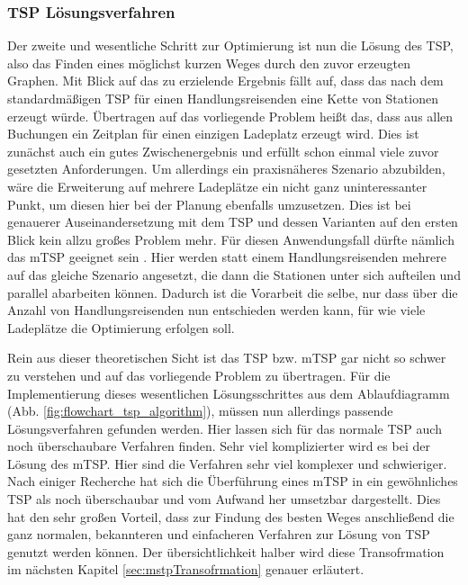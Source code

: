 \subsubsection{TSP Lösungsverfahren}
\label{sec:tspVerfahrenPlanung}

Der zweite und wesentliche Schritt zur Optimierung ist nun die Lösung des TSP, also das Finden eines möglichst kurzen Weges durch den zuvor erzeugten Graphen. Mit Blick auf das zu erzielende Ergebnis fällt auf, dass das nach dem standardmäßigen TSP für einen Handlungsreisenden eine Kette von Stationen erzeugt würde. Übertragen auf das vorliegende Problem heißt das, dass aus allen Buchungen ein Zeitplan für einen einzigen Ladeplatz erzeugt wird. Dies ist zunächst auch ein gutes Zwischenergebnis und erfüllt schon einmal viele zuvor gesetzten Anforderungen. Um allerdings ein praxisnäheres Szenario abzubilden, wäre die Erweiterung auf mehrere Ladeplätze ein nicht ganz uninteressanter Punkt, um diesen hier bei der Planung ebenfalls umzusetzen. Dies ist bei genauerer Auseinandersetzung mit dem TSP und dessen Varianten auf den ersten Blick kein allzu großes Problem mehr. Für diesen Anwendungsfall dürfte nämlich das mTSP geeignet sein \cite{mtsp}. Hier werden statt einem Handlungsreisenden mehrere auf das gleiche Szenario angesetzt, die dann die Stationen unter sich aufteilen und parallel abarbeiten können. Dadurch ist die Vorarbeit die selbe, nur dass über die Anzahl von Handlungsreisenden nun entschieden werden kann, für wie viele Ladeplätze die Optimierung erfolgen soll.

Rein aus dieser theoretischen Sicht ist das TSP bzw. mTSP gar nicht so schwer zu verstehen und auf das vorliegende Problem zu übertragen. Für die Implementierung dieses wesentlichen Lösungsschrittes aus dem Ablaufdiagramm (Abb. \ref{fig:flowchart_tsp_algorithm}), müssen nun allerdings passende Lösungsverfahren gefunden werden. Hier lassen sich für das normale TSP auch noch überschaubare Verfahren finden. Sehr viel komplizierter wird es bei der Lösung des mTSP. Hier sind die Verfahren sehr viel komplexer und schwieriger. Nach einiger Recherche hat sich die  Überführung eines mTSP in ein gewöhnliches TSP als noch überschaubar und vom Aufwand her umsetzbar dargestellt. Dies hat den sehr großen Vorteil, dass zur Findung des besten Weges anschließend die ganz normalen, bekannteren und einfacheren Verfahren zur Lösung von TSP genutzt werden können. Der übersichtlichkeit halber wird diese Transofrmation im nächsten Kapitel \ref{sec:mstpTransofrmation} genauer erläutert. \cite{mtsp, mtspAlgosAndTransform}


